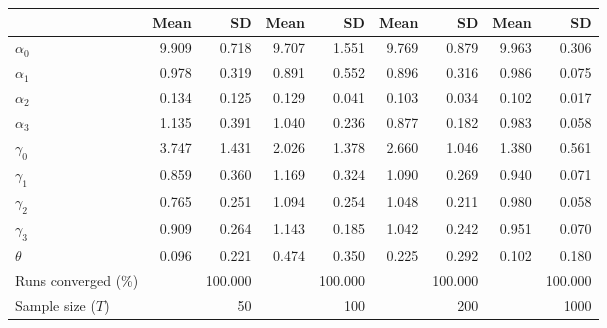 
\begin{tabular}[t]{lrrrrrrrr}
\toprule
  & Mean & SD & Mean  & SD  & Mean   & SD   & Mean    & SD   \\
\midrule
$\alpha_{0}$ & 9.909 & 0.718 & 9.707 & 1.551 & 9.769 & 0.879 & 9.963 & 0.306\\
$\alpha_{1}$ & 0.978 & 0.319 & 0.891 & 0.552 & 0.896 & 0.316 & 0.986 & 0.075\\
$\alpha_{2}$ & 0.134 & 0.125 & 0.129 & 0.041 & 0.103 & 0.034 & 0.102 & 0.017\\
$\alpha_{3}$ & 1.135 & 0.391 & 1.040 & 0.236 & 0.877 & 0.182 & 0.983 & 0.058\\
$\gamma_{0}$ & 3.747 & 1.431 & 2.026 & 1.378 & 2.660 & 1.046 & 1.380 & 0.561\\
$\gamma_{1}$ & 0.859 & 0.360 & 1.169 & 0.324 & 1.090 & 0.269 & 0.940 & 0.071\\
$\gamma_{2}$ & 0.765 & 0.251 & 1.094 & 0.254 & 1.048 & 0.211 & 0.980 & 0.058\\
$\gamma_{3}$ & 0.909 & 0.264 & 1.143 & 0.185 & 1.042 & 0.242 & 0.951 & 0.070\\
$\theta$ & 0.096 & 0.221 & 0.474 & 0.350 & 0.225 & 0.292 & 0.102 & 0.180\\
Runs converged (\%) &  & 100.000 &  & 100.000 &  & 100.000 &  & 100.000\\
Sample size ($T$) &  & 50 &  & 100 &  & 200 &  & 1000\\
\bottomrule
\end{tabular}

